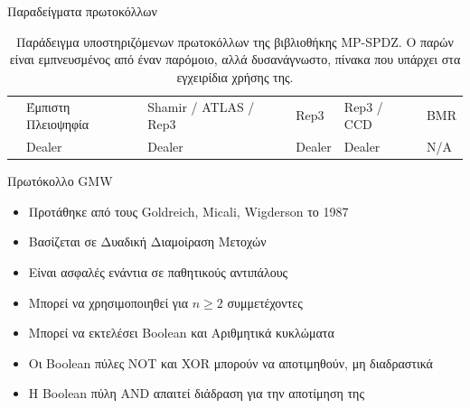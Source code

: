 \documentclass[10pt]{beamer}
\begin{document}
\begin{frame}[fragile,c]{Παραδείγματα πρωτοκόλλων}
\begin{block}{}
\begin{table}[h!]
{\begin{tabular}{|c|l|ll|ll|}
                        & Έμπιστη Πλειοψηφία                                                   & \multicolumn{1}{l|}{Shamir / ATLAS / Rep3}       & Rep3                   & \multicolumn{1}{l|}{Rep3 / CCD}                  & BMR               \\ \cline{2-6}
                        & Dealer                                                               & \multicolumn{1}{l|}{Dealer}                      & Dealer                 & \multicolumn{1}{l|}{Dealer}                      & N/A               \\ \hline
                    \end{tabular}
                }
                \caption{Παράδειγμα υποστηριζόμενων πρωτοκόλλων της βιβλιοθήκης MP-SPDZ. Ο παρών είναι εμπνευσμένος από έναν παρόμοιο, αλλά δυσανάγνωστο, πίνακα που υπάρχει στα εγχειρίδια χρήσης της.}
                \label{fig:mp-sdpz-protocols}
            \end{table}
        \end{block}
    \end{frame}
    \begin{frame}{Πρωτόκολλο GMW}
        \begin{block}{}
            \begin{itemize}
                \item Προτάθηκε από τους Goldreich, Micali, Wigderson το 1987
                \item Βασίζεται σε Δυαδική Διαμοίραση Μετοχών
                \item Είναι ασφαλές ενάντια σε παθητικούς αντιπάλους
                \item Μπορεί να χρησιμοποιηθεί για $n \ge 2$ συμμετέχοντες
                \item Μπορεί να εκτελέσει Boolean και Αριθμητικά κυκλώματα
                \item Οι Boolean πύλες NOT και XOR μπορούν να αποτιμηθούν, μη διαδραστικά
                \item Η Boolean πύλη AND απαιτεί διάδραση για την αποτίμηση της
            \end{itemize}
        \end{block}
    \end{frame}
\end{document}
